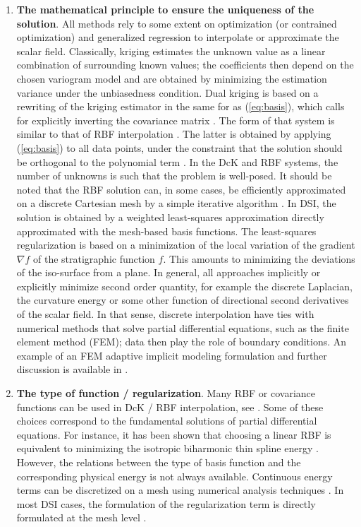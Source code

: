 \documentclass[final]{ring20}
\begin{document}
\begin{enumerate}
\item \textbf{The mathematical principle to ensure the uniqueness of the solution}. All methods rely to some extent on optimization (or contrained optimization) and generalized regression to interpolate or approximate the scalar field. Classically, kriging estimates the unknown value as a linear combination of surrounding known values; the coefficients then depend on the chosen variogram model and are obtained by minimizing the estimation variance under the unbiasedness condition. Dual kriging is based on a rewriting of the kriging estimator in the same for as (\ref{eq:basis}), which calls for explicitly inverting the covariance matrix \citep{Lajaunie1997MG,Calcagno2008PEPI}. The form of that system is similar to that of RBF interpolation \citep{Dubrule1984CG,Hillier2014MG}. The latter is obtained by applying (\ref{eq:basis}) to all data points, under the constraint that the solution should be orthogonal to the polynomial term \citep{Carr2001,Hillier2014MG}.  In the DcK and RBF systems, the number of unknowns is such that the problem is well-posed. It should be noted that the RBF solution can, in some cases, be efficiently approximated on a discrete Cartesian mesh by a simple iterative algorithm \citep{Park2006ITVCG}. In DSI, the solution is obtained by a weighted least-squares approximation directly approximated with the mesh-based basis functions. The least-squares regularization is based on a minimization of the local variation of the gradient $\nabla f$ of the stratigraphic function $f$. This amounts to minimizing the deviations of the iso-surface from a plane. In general, all approaches implicitly or explicitly minimize second order quantity, for example the discrete Laplacian, the curvature energy or some other function of directional second derivatives of the scalar field. In that sense, discrete interpolation have ties with numerical methods that solve partial differential equations, such as the finite element method (FEM); data then play the role of boundary conditions. An example of an FEM adaptive implicit modeling formulation and further discussion is available in \citet{Renaudeau2019MG}.

\item \textbf{The type of function / regularization}. Many RBF or covariance functions can be used in DcK / RBF interpolation, see \citet{Hillier2014MG}. Some of these choices correspond to the fundamental solutions of partial differential equations. For instance, it has been shown that choosing a linear RBF is equivalent to minimizing the isotropic biharmonic thin spline energy \citep{Carr2001}. However, the relations between the type of basis function and the corresponding physical energy is not always available. Continuous energy terms can be discretized on a mesh using numerical analysis techniques \citep{Renaudeau2019MG}. In most DSI cases, the formulation of the regularization term is directly formulated at the mesh level \citep{Frank2007CG,Souche20137ECEISE2}. 


\end{enumerate}
\end{document}
